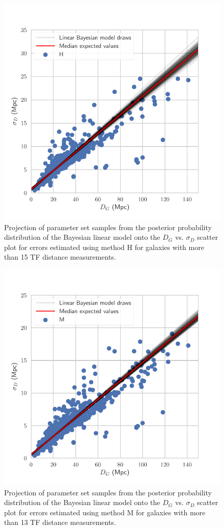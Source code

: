 \documentclass[a4paper,fleqn,usenatbib]{mnras}
\begin{document}
\begin{figure}
	\includegraphics[scale=0.7]{drawsl}
    \caption{Projection of parameter set samples from the posterior probability distribution of the Bayesian linear model onto the $D_G$ vs. $\sigma_D$ scatter plot for errors estimated using method H for galaxies with more than 15 TF distance measurements.}
    \label{fig:drawsl}
\end{figure}
\begin{figure}
	\includegraphics[scale=0.7]{drawsl2}
    \caption{Projection of parameter set samples from the posterior probability distribution of the Bayesian linear model onto the $D_G$ vs. $\sigma_D$ scatter plot for errors estimated using method M for galaxies with more than 13 TF distance measurements.}
    \label{fig:drawsl2}
\end{figure}
\end{document}

